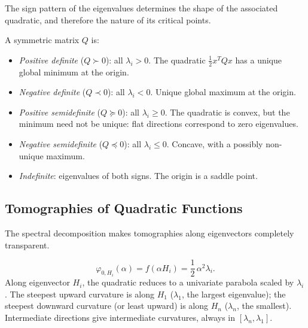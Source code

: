 The sign pattern of the eigenvalues determines the shape of the associated quadratic, and therefore the nature of its critical points.

\begin{definition}\label{def:definiteness}
	A symmetric matrix $Q$ is:
	\begin{itemize}
		\item \emph{Positive definite} ($Q \succ 0$): all $\lambda_i > 0$.
			The quadratic $\frac{1}{2} x^T Q x$ has a unique global minimum at the origin.
		\item \emph{Negative definite} ($Q \prec 0$): all $\lambda_i < 0$.
			Unique global maximum at the origin.
		\item \emph{Positive semidefinite} ($Q \succeq 0$): all $\lambda_i \geq 0$.
			The quadratic is convex, but the minimum need not be unique: flat directions correspond to zero eigenvalues.
		\item \emph{Negative semidefinite} ($Q \preceq 0$): all $\lambda_i \leq 0$.
			Concave, with a possibly non-unique maximum.
		\item \emph{Indefinite}: eigenvalues of both signs.
			The origin is a saddle point.
	\end{itemize}
\end{definition}


\subsection{Tomographies of Quadratic Functions}\label{sec:quad-tomographies}

The spectral decomposition makes tomographies along eigenvectors completely transparent.

\begin{equation}\label{eq:tomography-eigenvector}
	\varphi_{0, H_i}(\alpha) = f(\alpha H_i) = \frac{1}{2}\, \alpha^2 \lambda_i.
\end{equation}
Along eigenvector $H_i$, the quadratic reduces to a univariate parabola scaled by $\lambda_i$.
The steepest upward curvature is along $H_1$ ($\lambda_1$, the largest eigenvalue); the steepest downward curvature (or least upward) is along $H_n$ ($\lambda_n$, the smallest).
Intermediate directions give intermediate curvatures, always in $[\lambda_n,\lambda_1]$.

